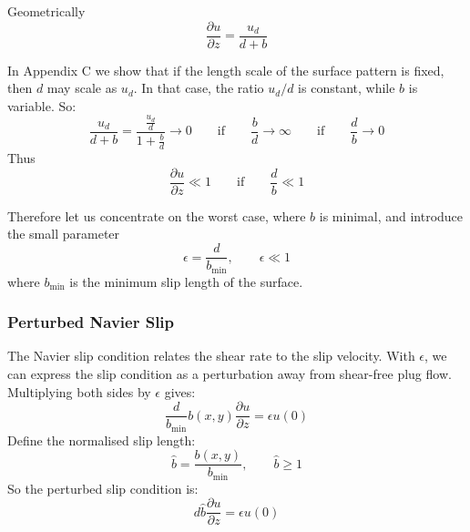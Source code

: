 \documentclass[a4paper]{report}
\newcommand{\bmin}{\ensuremath{b_{\mathrm{min}}}}
\begin{document}
\begin{center}
\end{center}

Geometrically
\begin{equation}
\frac{\partial u}{\partial z} = \frac{u_d}{d+b} 
\end{equation}

In Appendix C we show that if the length scale of the surface pattern is fixed, then $d$ may scale as $u_d$.  In that case, the ratio $u_d/d$ is constant, while $b$ is variable. So:
\begin{equation}
\frac{u_d}{d+b} = \frac{\frac{u_d}{d}}{1 + \frac{b}{d}} \to 0 
\qquad \text{if} \qquad
\frac{b}{d} \to \infty
\qquad \text{if} \qquad
\frac{d}{b} \to 0
\end{equation}
Thus
\begin{equation}
\frac{\partial u}{\partial z} \ll 1 \qquad \text{if} \qquad\frac{d}{b} \ll 1
\end{equation}

Therefore let us concentrate on the worst case, where $b$ is minimal, and introduce the small parameter
\begin{equation}
\epsilon = \frac{d}{\bmin}, \qquad \epsilon \ll 1
\end{equation}
where $\bmin$ is the minimum slip length of the surface.

\subsubsection*{Perturbed Navier Slip}

The Navier slip condition relates the shear rate to the slip velocity.  With $\epsilon$, we can express the slip condition as a perturbation away from shear-free plug flow.  Multiplying both sides by $\epsilon$ gives:
\begin{equation}
\frac{d}{\bmin} b(x,y) \frac{\partial u }{\partial z} = \epsilon u(0)
\end{equation}
Define the normalised slip length:
\begin{equation}
\hat{b} = \frac{b(x,y)}{\bmin},   \qquad \hat{b} \geq 1
\end{equation}
So the perturbed slip condition is:
\begin{equation}
d \hat{b} \frac{\partial u}{\partial z} = \epsilon u(0)
\end{equation}
\end{document}
